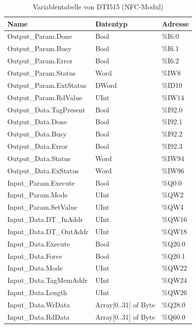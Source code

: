 \begin{table}[h!]
	\centering
	\renewcommand{\arraystretch}{1.0} %
	\footnotesize
	\begin{tabular}{|p{6cm}|p{4.36cm}|p{3cm}|}
		\hline
		\textbf{Name} & \textbf{Datentyp} & \textbf{Adresse} \\ \hline
		Output\_Param.Done & Bool & \%I6.0 \\ \hline
		Output\_Param.Busy & Bool & \%I6.1 \\ \hline
		Output\_Param.Error & Bool & \%I6.2 \\ \hline
		Output\_Param.Status & Word & \%IW8 \\ \hline
		Output\_Param.ExtStatus & DWord & \%ID10 \\ \hline
		Output\_Param.RdValue & UInt & \%IW14 \\ \hline
		Output\_Data.TagPresent & Bool & \%I92.0 \\ \hline
		Output\_Data.Done & Bool & \%I92.1 \\ \hline
		Output\_Data.Busy & Bool & \%I92.2 \\ \hline
		Output\_Data.Error & Bool & \%I92.3 \\ \hline
		Output\_Data.Status & Word & \%IW94 \\ \hline
		Output\_Data.ExStatus & Word & \%IW96 \\ \hline
		Input\_Param.Execute & Bool & \%Q0.0 \\ \hline
		Input\_Param.Mode & UInt & \%QW2 \\ \hline
		Input\_Param.SetValue & UInt & \%QW4 \\ \hline
		Input\_Data.DT\_InAddr & UInt & \%QW16 \\ \hline
		Input\_Data.DT\_OutAddr & UInt & \%QW18 \\ \hline
		Input\_Data.Execute & Bool & \%Q20.0 \\ \hline
		Input\_Data.Force & Bool & \%Q20.1 \\ \hline
		Input\_Data.Mode & UInt & \%QW22 \\ \hline
		Input\_Data.TagMemAddr & UInt & \%QW24 \\ \hline
		Input\_Data.Length & UInt & \%QW26 \\ \hline
		Input\_Data.WrData & Array[0..31] of Byte & \%Q28.0 \\ \hline
		Input\_Data.RdData & Array[0..31] of Byte & \%Q60.0 \\ \hline
	\end{tabular}
	\caption{Variablentabelle von DTI515 (NFC-Modul)}
	\label{tab:DTI515}
\end{table}

